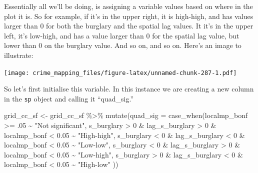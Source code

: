 \documentclass[
  krantz2]{krantz}
\makeatletter
\newenvironment{Shaded}{\begin{snugshade}}{\end{snugshade}}
\newcommand{\AttributeTok}[1]{\textcolor[rgb]{0.61,0.61,0.61}{#1}}
\newcommand{\DecValTok}[1]{\textcolor[rgb]{0.06,0.06,0.06}{#1}}
\newcommand{\FloatTok}[1]{\textcolor[rgb]{0.06,0.06,0.06}{#1}}
\newcommand{\FunctionTok}[1]{\textcolor[rgb]{0,0,0}{#1}}
\newcommand{\NormalTok}[1]{#1}
\newcommand{\OtherTok}[1]{\textcolor[rgb]{0.37,0.37,0.37}{#1}}
\newcommand{\SpecialCharTok}[1]{\textcolor[rgb]{0,0,0}{#1}}
\newcommand{\StringTok}[1]{\textcolor[rgb]{0.5,0.5,0.5}{#1}}
\newenvironment{kframe}{%
\medskip{}
\setlength{\fboxsep}{.8em}
 \def\at@end@of@kframe{}%
 \ifinner\ifhmode%
  \def\at@end@of@kframe{\end{minipage}}%
  \begin{minipage}{\columnwidth}%
 \fi\fi%
 \def\FrameCommand##1{\hskip\@totalleftmargin \hskip-\fboxsep
 \colorbox{shadecolor}{##1}\hskip-\fboxsep
     \hskip-\linewidth \hskip-\@totalleftmargin \hskip\columnwidth}%
 \MakeFramed {\advance\hsize-\width
   \@totalleftmargin\z@ \linewidth\hsize
   \@setminipage}}%
 {\par\unskip\endMakeFramed%
 \at@end@of@kframe}
\renewenvironment{Shaded}{\begin{kframe}}{\end{kframe}}
\makeatother
\begin{document}
Essentially all we'll be doing, is assigning a variable values based on where in the plot it is. So for example, if it's in the upper right, it is high-high, and has values larger than 0 for both the burglary and the spatial lag values. It it's in the upper left, it's low-high, and has a value larger than 0 for the spatial lag value, but lower than 0 on the burglary value. And so on, and so on. Here's an image to illustrate:

\texttt{[image: crime\_mapping\_files/figure-latex/unnamed-chunk-287-1.pdf]}

So let's first initialise this variable. In this instance we are creating a new column in the \texttt{sp} object and calling it ``quad\_sig.''

\begin{Shaded}
\begin{Highlighting}[]
\NormalTok{grid\_cc\_sf }\OtherTok{\textless{}{-}}\NormalTok{ grid\_cc\_sf }\SpecialCharTok{\%\textgreater{}\%} 
  \FunctionTok{mutate}\NormalTok{(}\AttributeTok{quad\_sig =} \FunctionTok{case\_when}\NormalTok{(localmp\_bonf }\SpecialCharTok{\textgreater{}=}\NormalTok{ .}\DecValTok{05} \SpecialCharTok{\textasciitilde{}} \StringTok{"Not significant"}\NormalTok{, }
\NormalTok{                              s\_burglary }\SpecialCharTok{\textgreater{}} \DecValTok{0} \SpecialCharTok{\&}  
\NormalTok{                                lag\_s\_burglary }\SpecialCharTok{\textgreater{}} \DecValTok{0} \SpecialCharTok{\&}  
\NormalTok{                                localmp\_bonf }\SpecialCharTok{\textless{}} \FloatTok{0.05} \SpecialCharTok{\textasciitilde{}} \StringTok{"High{-}high"}\NormalTok{, }
\NormalTok{                              s\_burglary }\SpecialCharTok{\textless{}} \DecValTok{0} \SpecialCharTok{\&}
\NormalTok{                                lag\_s\_burglary }\SpecialCharTok{\textless{}} \DecValTok{0} \SpecialCharTok{\&} 
\NormalTok{                                localmp\_bonf }\SpecialCharTok{\textless{}} \FloatTok{0.05} \SpecialCharTok{\textasciitilde{}} \StringTok{"Low{-}low"}\NormalTok{, }
\NormalTok{                              s\_burglary }\SpecialCharTok{\textless{}} \DecValTok{0} \SpecialCharTok{\&}
\NormalTok{                                lag\_s\_burglary }\SpecialCharTok{\textgreater{}} \DecValTok{0} \SpecialCharTok{\&}
\NormalTok{                                localmp\_bonf }\SpecialCharTok{\textless{}} \FloatTok{0.05} \SpecialCharTok{\textasciitilde{}} \StringTok{"Low{-}high"}\NormalTok{, }
\NormalTok{                              s\_burglary }\SpecialCharTok{\textgreater{}} \DecValTok{0} \SpecialCharTok{\&} 
\NormalTok{                                lag\_s\_burglary }\SpecialCharTok{\textless{}} \DecValTok{0} \SpecialCharTok{\&} 
\NormalTok{                                localmp\_bonf }\SpecialCharTok{\textless{}} \FloatTok{0.05} \SpecialCharTok{\textasciitilde{}} \StringTok{"High{-}low"}\NormalTok{ ))}
\end{Highlighting}
\end{Shaded}
\end{document}
